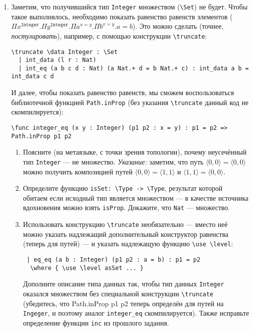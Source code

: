 \documentclass[10pt,a4paper,oneside]{article}
\begin{document}
\begin{enumerate}
\item Заметим, что получившийся тип \verb!Integer! множеством (\verb!\Set!) не будет. Чтобы такое выполнялось, необходимо
показать равенство равенств элементов ($\Pi x^\texttt{Integer}.\Pi y^\texttt{Integer}.\Pi a^{x = y}.\Pi b^{x = y}.a = b$). 
Это можно сделать (точнее, \emph{постулировать}), например, с помощью конструкции \verb!\truncate!:

\begin{verbatim}
\truncate \data Integer : \Set
  | int_data (l r : Nat)
  | int_eq (a b c d : Nat) (a Nat.+ d = b Nat.+ c) : int_data a b = int_data c d
\end{verbatim}

И далее, чтобы показать равенство равенств, мы сможем воспользоваться библиотечной функцией \verb!Path.inProp!
(без указания \verb!\truncate! данный код не скомпилируется):

\begin{verbatim}
\func integer_eq (x y : Integer) (p1 p2 : x = y) : p1 = p2 => Path.inProp p1 p2
\end{verbatim}

\begin{enumerate}
\item Поясните (на метаязыке, с точки зрения топологии), почему неусечённый тип \verb!Integer! --- не множество. \emph{Указание:} 
заметим, что путь $\langle 0, 0\rangle = \langle 0, 0 \rangle$ можно получить композицией путей $\langle 0, 0 \rangle = \langle 1,1 \rangle$
и $\langle 1, 1\rangle = \langle 0, 0 \rangle$.
\item Определите функцию \verb!isSet: \Type -> \Type!, результат которой обитаем если исходный тип является множеством ---
в качестве источника вдохновения можно взять \verb!isProp!.
Докажите, что \verb!Nat! --- множество.
\item Использовать конструкцию \verb!\truncate! необязательно --- вместо неё можно указать надлежащий дополнительный конструктор
равенства (теперь для путей) --- и указать надлежащую функцию \verb!\use \level!:
\begin{verbatim}
 | eq_eq (a b : Integer) (p1 p2 : a = b) : p1 = p2
  \where { \use \level asSet ... }
\end{verbatim}

Дополните описание типа данных так, чтобы тип данных \verb!Integer! оказался множеством без специальной конструкции 
\verb!\truncate! (убедитесь, что Path.inProp p1 p2 теперь определён для путей на \verb!Ingeger!, 
и поэтому аналог \verb!integer_eq! скомпилируется).
Также исправьте определение функции \verb!inc! из прошлого задания.


\end{enumerate}
\end{enumerate}
\end{document}

